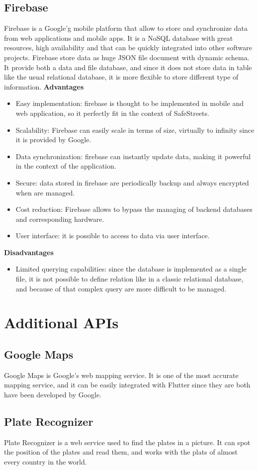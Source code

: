 \documentclass[../ITD.tex]{subfiles}
\begin{document}
    \subsection{Firebase}\label{subsec:firebase}
    Firebase is a Google'g mobile platform that allow to store and synchronize data from web applications and mobile apps.
    It is a NoSQL database with great resources, high availability and that can be quickly integrated into other software projects.
    Firebase store data as huge JSON file document with dynamic schema.
    It provide both a data and file database, and since it does not store data in table like the usual relational database, it is more flexible to store different type of information.
    \newline
    \textbf{Advantages}
    \begin{itemize}
        \item Easy implementation: firebase is thought to be implemented in mobile and web application, so it perfectly fit in the context of SafeStreets.
        \item Scalability: Firebase can easily scale in terms of size, virtually to infinity since it is provided by Google.
        \item Data synchronization: firebase can instantly update data, making it powerful in the context of the application.
        \item Secure: data stored in firebase are periodically backup and always encrypted when are managed.
        \item Cost reduction: Firebase allows to bypass the managing of backend databases and corresponding hardware.
        \item User interface: it is possible to access to data via user interface.
    \end{itemize}
    \textbf{Disadvantages}
    \begin{itemize}
        \item Limited querying capabilities: since the database is implemented as a single file, it is not possible to define relation like in a classic relational database, and because of that complex query are more difficult to be managed.
    \end{itemize}
    \section{Additional APIs}\label{sec:additional-apis}
    \subsection{Google Maps}\label{subsec:google-maps}
    Google Maps is Google's web mapping service.
    It is one of the most accurate mapping service, and it can be easily integrated with Flutter since they are both have been developed by Google.
    \subsection{Plate Recognizer}\label{subsec:plate-recognizer}
    Plate Recognizer is a web service used to find the plates in a picture.
    It can spot the position of the plates and read them, and works with the plats of almost every country in the world.
\end{document}
